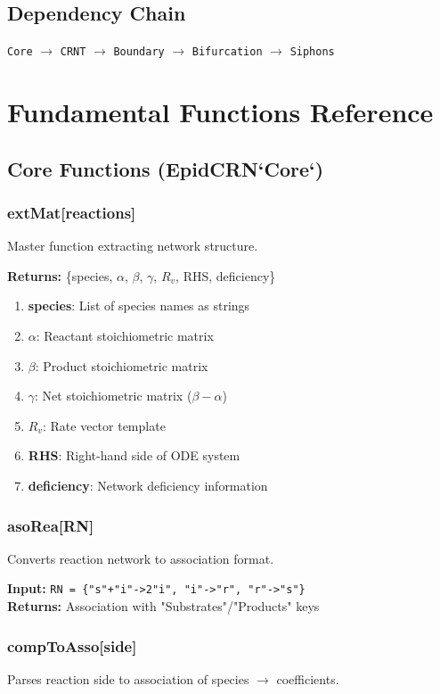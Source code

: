 \documentclass{article}
\begin{document}
\subsection{Dependency Chain}
\texttt{Core} $\rightarrow$ \texttt{CRNT} $\rightarrow$ \texttt{Boundary} $\rightarrow$ \texttt{Bifurcation} $\rightarrow$ \texttt{Siphons}

\section{Fundamental Functions Reference}

\subsection{Core Functions (EpidCRN`Core`)}

\subsubsection{extMat[reactions]}
Master function extracting network structure.

\textbf{Returns:} \{species, $\alpha$, $\beta$, $\gamma$, $R_v$, RHS, deficiency\}
\begin{enumerate}
\item \textbf{species}: List of species names as strings
\item $\alpha$: Reactant stoichiometric matrix
\item $\beta$: Product stoichiometric matrix
\item $\gamma$: Net stoichiometric matrix ($\beta - \alpha$)
\item $R_v$: Rate vector template
\item \textbf{RHS}: Right-hand side of ODE system
\item \textbf{deficiency}: Network deficiency information
\end{enumerate}

\subsubsection{asoRea[RN]}
Converts reaction network to association format.

\textbf{Input:} \texttt{RN = \{"s"+"i"->2"i", "i"->"r", "r"->"s"\}}\\
\textbf{Returns:} Association with "Substrates"/"Products" keys

\subsubsection{compToAsso[side]}
Parses reaction side to association of species $\rightarrow$ coefficients.
\end{document}
